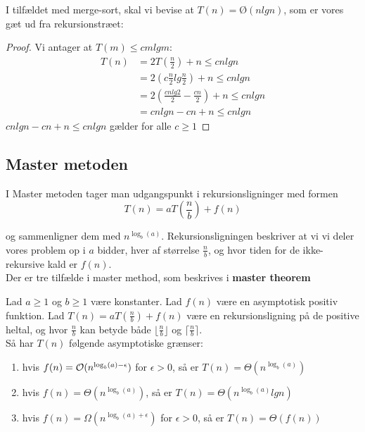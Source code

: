 I tilfældet med merge-sort, skal vi bevise at $T(n) = Ø(nlgn)$, som er vores gæt ud fra rekursionstræet:\\

\begin{proof}
  Vi antager at $T(m) \leq cmlgm$:
  \begin{align*}
    T(n) &= 2T(\frac{n}{2}) + n \leq cnlgn\\
         &= 2(c\frac{n}{2}lg\frac{n}{2}) + n \leq cnlgn\\
         &= 2(\frac{cnlg2}{2} - \frac{cn}{2}) + n \leq cnlgn\\
         &= cnlgn - cn + n \leq cnlgn
  \end{align*}
  $cnlgn - cn + n \leq cnlgn$ gælder for alle $c \geq 1$
\end{proof}

\subsection{Master metoden}
I Master metoden tager man udgangspunkt i rekursionsligninger med formen
$$T(n) = aT(\frac{n}{b}) + f(n)$$

og sammenligner dem med $n^{\log_b(a)}$. Rekursionsligningen beskriver at vi vi deler vores problem op i $a$ bidder, hver af størrelse $\frac{n}{b}$, og hvor tiden for de ikke-rekursive kald er $f(n)$.\\

Der er tre tilfælde i master method, som beskrives i \textbf{master theorem}
\begin{theorem}
  Lad $a \geq 1$ og $b \geq 1$ være konstanter. Lad $f(n)$ være en asymptotisk positiv funktion. Lad $T(n) = aT(\frac{n}{b}) + f(n)$ være en rekursionsligning på de positive heltal, og hvor $\frac{n}{b}$ kan betyde både $\lfloor \frac{n}{b}\rfloor$ og $\lceil \frac{n}{b}\rceil$.\\
  Så har $T(n)$ følgende asymptotiske grænser:
  \begin{enumerate}
  \item hvis $f(n) = \mathcal{O}(n^{\log_b(a) - \epsilon})$ for $\epsilon > 0$, så er $T(n) = \Theta(n^{\log_b(a)})$
  \item hvis $f(n) = \Theta(n^{\log_b(a)})$, så er $T(n) = \Theta(n^{\log_b(a)}lgn)$
  \item hvis $f(n) = \Omega(n^{\log_b(a) + \epsilon})$ for $\epsilon > 0$, så er $T(n) = \Theta(f(n))$
  \end{enumerate}
\end{theorem}

